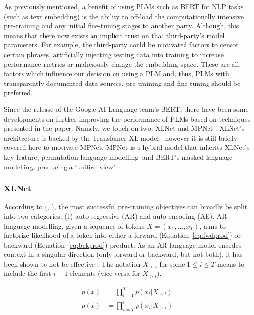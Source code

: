 \documentclass[10pt,oneside]{report}
\renewcommand{\citet}[1]{\citeauthor{#1}, \citeyear{#1}}
\begin{document}
As previously mentioned, a benefit of using PLMs such as BERT for NLP tasks (such as text embedding) is the ability to off-load the computationally intensive pre-training and any initial fine-tuning stages to another party. Although, this means that there now exists an implicit trust on that third-party's model parameters. For example, the third-party could be motivated factors to censor certain phrases, artificially injecting testing data into training to increase performance metrics or maliciously change the embedding space. These are all factors which influence our decision on using a PLM and, thus, PLMs with transparently documented data sources, pre-training and fine-tuning should be preferred.

Since the release of the Google AI Language team's BERT, there have been some developments on further improving the performance of PLMs based on techniques presented in the paper. Namely, we touch on two: XLNet \cite{yang2019xlnet} and MPNet \cite{song2020mpnet}. 
XLNet's architecture is backed by the Transfomer-XL model \cite{dai2019transformer}, however it is still briefly covered here to motivate MPNet. MPNet is a hybrid model that inherits XLNet's key feature, permutation language modelling, and BERT's masked language modelling, producing a `unified view'.

\subsubsection{XLNet}\label{sec:xlnet}

According to (\citet{yang2019xlnet}), the most successful pre-training objectives can broadly be split into two categories: (1) auto-regressive (AR) and auto-encoding (AE). AR language modelling, given a sequence of tokens $X = (x_1, ..., x_T)$, aims to factorize likelihood of a token into either a forward (Equation~\ref{eq:fwdprod}) or backward (Equation~\ref{eq:bckprod}) product. As an AR language model encodes context in a singular direction (only forward or backward, but not both), it has been shown to not be effective \cite{yang2019xlnet}. The notation $X_{<i}$ for some $1 \le i \le T$ means to include the first $i - 1$ elements (vice versa for $X_{>i}$).

\begin{align}
    p(x) &= \prod_{i=1}^{T} p(x_i | X_{<i})
    \label{eq:fwdprod} \\
    p(x) &= \prod_{i=T}^{i} p(x_i | X_{>i})
    \label{eq:bckprod}
\end{align}
\end{document}
